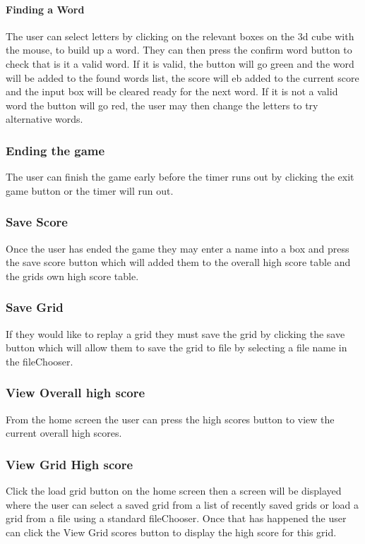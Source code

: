 \documentclass{project}
\begin{document}
			\paragraph{Finding a Word}
			The user can select letters by clicking on the relevant boxes on the 3d cube with the mouse, to build up a word. They can then press the confirm word button to check that is it a valid word. If it is valid, the button will go green and the word will be added to the found words list, the score will eb added to the current score and the input box will be cleared ready for the next word. If it is not a valid word the button will go red, the user may then change the letters to try alternative words.
		\subsubsection{Ending the game} \label{Ending the game}
			The user can finish the game early before the timer runs out by clicking the exit game button or the timer will run out.
		\subsubsection{Save Score} \label{Save score}
			Once the user has ended the game they may enter a name into a box and press the save score button which will added them to the overall high score table and the grids own high score table.
		\subsubsection{Save Grid}	\label{Save grid}
			If they would like to replay a grid they must save the grid by clicking the save button which will allow them to save the grid to file by selecting a file name in the fileChooser.
		\subsubsection{View Overall high score} \label{View Overall highscore}
		From the home screen the user can press the high scores button to view the current overall high scores.
		\subsubsection{View Grid High score} \label{View Grid HigScore}
		Click the load grid button on the home screen then a screen will be displayed where the user can select a saved grid from a list of recently saved grids or load a grid from a file using a standard fileChooser. Once that has happened the user can click the View Grid scores button to display the high score for this grid.
		
\end{document}
